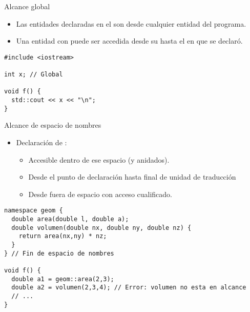 \begin{frame}[t,fragile]{Alcance global}
\begin{itemize}
  \item Las entidades declaradas en el  
        son  desde cualquier entidad del programa.
  \item Una entidad con 
        puede ser accedida desde su  
        hasta el  en que se declaró.
\end{itemize}
\begin{lstlisting}
#include <iostream>

int x; // Global

void f() {
  std::cout << x << "\n";
}
\end{lstlisting}
\end{frame}

\begin{frame}[t,fragile]{Alcance de espacio de nombres}
\begin{itemize}
  \item Declaración  de :
    \begin{itemize}
      \item Accesible dentro de ese espacio (y anidados).
      \item Desde el punto de declaración hasta final de unidad de traducción
      \item Desde fuera de espacio con acceso cualificado.
    \end{itemize}
\end{itemize}

\begin{lstlisting}
namespace geom {
  double area(double l, double a);
  double volumen(double nx, double ny, double nz) {
    return area(nx,ny) * nz;
  }
} // Fin de espacio de nombres

void f() {
  double a1 = geom::area(2,3);
  double a2 = volumen(2,3,4); // Error: volumen no esta en alcance
  // ...
}
\end{lstlisting}
\end{frame}

